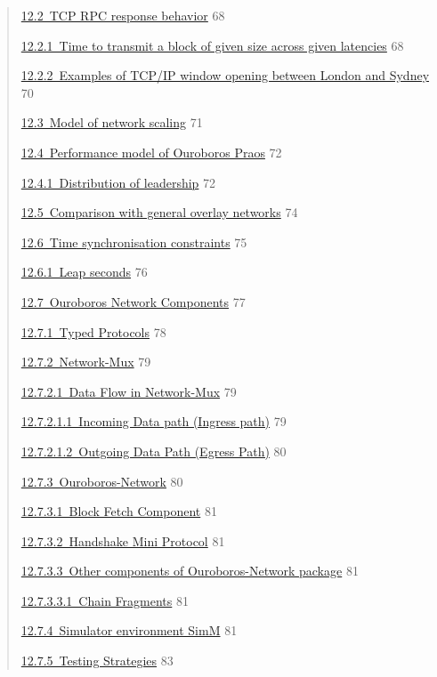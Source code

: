 \documentclass[]{article}
\begin{document}
\begin{quote}
\protect\hyperlink{tcp-rpc-response-behavior}{​12.2​~TCP RPC response
behavior} 68

\protect\hyperlink{time-to-transmit-a-block-of-given-size-across-given-latencies}{​12.2.1​~Time
to transmit a block of given size across given latencies} 68

\protect\hyperlink{examples-of-tcpip-window-opening-between-london-and-sydney}{​12.2.2​~Examples
of TCP/IP window opening between London and Sydney} 70

\protect\hyperlink{model-of-network-scaling}{​12.3​~Model of network
scaling} 71

\protect\hyperlink{performance-model-of-ouroboros-praos}{​12.4​~Performance
model of Ouroboros Praos} 72

\protect\hyperlink{distribution-of-leadership}{​12.4.1​~Distribution of
leadership} 72

\protect\hyperlink{comparison-with-general-overlay-networks}{​12.5​~Comparison
with general overlay networks} 74

\protect\hyperlink{time-synchronisation-constraints}{​12.6​~Time
synchronisation constraints} 75

\protect\hyperlink{leap-seconds}{​12.6.1​~Leap seconds} 76

\protect\hyperlink{ouroboros-network-components}{​12.7​~Ouroboros
Network Components} 77

\protect\hyperlink{typed-protocols}{​12.7.1​~Typed Protocols} 78

\protect\hyperlink{network-mux}{​12.7.2​~Network-Mux} 79

\protect\hyperlink{data-flow-in-network-mux}{​12.7.2.1​~Data Flow in
Network-Mux} 79

\protect\hyperlink{incoming-data-path-ingress-path}{​12.7.2.1.1​~Incoming
Data path (Ingress path)} 79

\protect\hyperlink{outgoing-data-path-egress-path}{​12.7.2.1.2​~Outgoing
Data Path (Egress Path)} 80

\protect\hyperlink{ouroboros-network}{​12.7.3​~Ouroboros-Network} 80

\protect\hyperlink{block-fetch-component}{​12.7.3.1​~Block Fetch
Component} 81

\protect\hyperlink{handshake-mini-protocol}{​12.7.3.2​~Handshake Mini
Protocol} 81

\protect\hyperlink{other-components-of-ouroboros-network-package}{​12.7.3.3​~Other
components of Ouroboros-Network package} 81

\protect\hyperlink{chain-fragments}{​12.7.3.3.1​~Chain Fragments} 81

\protect\hyperlink{simulator-environment-simm}{​12.7.4​~Simulator
environment SimM} 81

\protect\hyperlink{testing-strategies}{​12.7.5​~Testing Strategies} 83
\end{quote}
\end{document}
